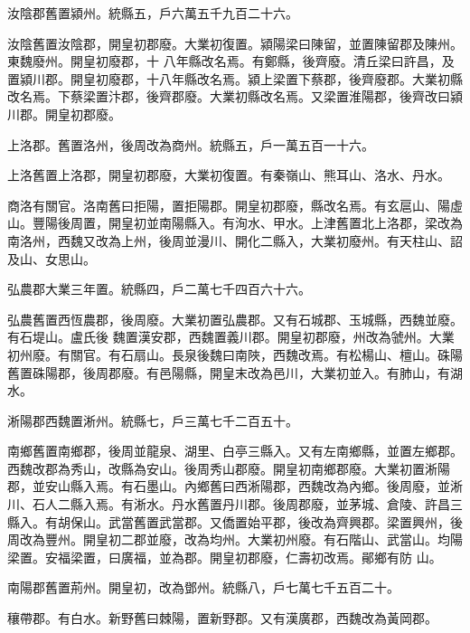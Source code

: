 \begin{pinyinscope}
 汝陰郡舊置潁州。統縣五，戶六萬五千九百二十六。



 汝陰舊置汝陰郡，開皇初郡廢。大業初復置。潁陽梁曰陳留，並置陳留郡及陳州。東魏廢州。開皇初廢郡，十
 八年縣改名焉。有鄭縣，後齊廢。清丘梁曰許昌，及置潁川郡。開皇初廢郡，十八年縣改名焉。潁上梁置下蔡郡，後齊廢郡。大業初縣改名焉。下蔡梁置汴郡，後齊郡廢。大業初縣改名焉。又梁置淮陽郡，後齊改曰潁川郡。開皇初郡廢。



 上洛郡。舊置洛州，後周改為商州。統縣五，戶一萬五百一十六。



 上洛舊置上洛郡，開皇初郡廢，大業初復置。有秦嶺山、熊耳山、洛水、丹水。



 商洛有關官。洛南舊曰拒陽，置拒陽郡。開皇初郡廢，縣改名焉。有玄扈山、陽虛山。豐陽後周置，開皇初並南陽縣入。有洵水、甲水。上津舊置北上洛郡，梁改為南洛州，西魏又改為上州，後周並漫川、開化二縣入，大業初廢州。有天柱山、詔及山、女思山。



 弘農郡大業三年置。統縣四，戶二萬七千四百六十六。



 弘農舊置西恆農郡，後周廢。大業初置弘農郡。又有石城郡、玉城縣，西魏並廢。有石堤山。盧氏後
 魏置漢安郡，西魏置義川郡。開皇初郡廢，州改為虢州。大業初州廢。有關官。有石扇山。長泉後魏曰南陜，西魏改焉。有松楊山、檀山。硃陽舊置硃陽郡，後周郡廢。有邑陽縣，開皇末改為邑川，大業初並入。有肺山，有湖水。



 淅陽郡西魏置淅州。統縣七，戶三萬七千二百五十。



 南鄉舊置南鄉郡，後周並龍泉、湖里、白亭三縣入。又有左南鄉縣，並置左鄉郡。西魏改郡為秀山，改縣為安山。後周秀山郡廢。開皇初南鄉郡廢。大業初置淅陽郡，並安山縣入焉。有石墨山。內鄉舊曰西淅陽郡，西魏改為內鄉。後周廢，並淅川、石人二縣入焉。有淅水。丹水舊置丹川郡。後周郡廢，並茅城、倉陵、許昌三縣入。有胡保山。武當舊置武當郡。又僑置始平郡，後改為齊興郡。梁置興州，後周改為豐州。開皇初二郡並廢，改為均州。大業初州廢。有石階山、武當山。均陽梁置。安福梁置，曰廣福，並為郡。開皇初郡廢，仁壽初改焉。鄖鄉有防
 山。



 南陽郡舊置荊州。開皇初，改為鄧州。統縣八，戶七萬七千五百二十。



 穰帶郡。有白水。新野舊曰棘陽，置新野郡。又有漢廣郡，西魏改為黃岡郡。




\end{pinyinscope}
